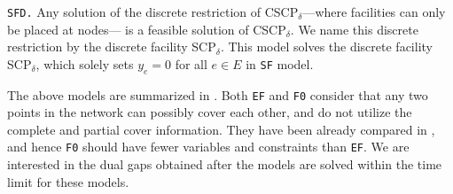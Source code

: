 \documentclass[review]{elsarticle}
\newcommand{\dlt}{{\delta}}
\newcommand{\problem}{CSCP$_\dlt$}
\newcommand{\dfproblem}{discrete facility SCP$_\dlt$}
\theoremstyle{definition}
\begin{document}
\texttt{SFD.}  Any solution of the discrete restriction of \problem---where facilities can only be placed at nodes--- is a feasible solution of \problem. We name this discrete restriction by the \dfproblem.  This model solves the \dfproblem, which solely sets $y_e = 0$ for all $e \in E$ in \texttt{SF} model.

The above models are summarized in . Both \texttt{EF} and \texttt{F0} consider that any two points in the network can possibly cover each other, and do not utilize the complete and partial cover information. They have been already compared in , and hence \texttt{F0} should have fewer variables and constraints than \texttt{EF}. We are interested in the dual gaps obtained after the models are solved within the time limit for these models. \\
\begin{comment}
We use  $ A \prec B$ to denote that $B$ is an improved model to $A$ in terms of the dual gap and solving time, and we have the conjecture:
 $\texttt{EF} \prec \texttt{F0} \prec  \texttt{F} \prec  \texttt{SF} \prec  \texttt{RF}$. This conjecture was indicated by our experiments, as we show in our analysis.
 
\end{comment}
 
\end{document}
